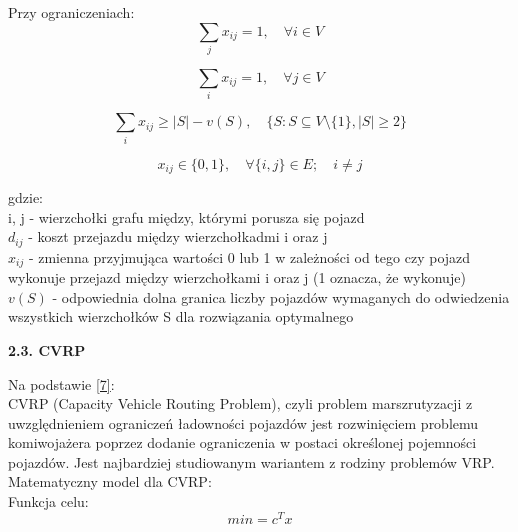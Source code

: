\documentclass[a4paper, twoside, 12pt, justified]{article}
\begin{document}
	Przy ograniczeniach:\\
	
	\begin{equation}
	{\sum\limits_{j} x_{ij} = 1, \quad \forall i \in V }
	\end{equation}
	
	\begin{equation}
	{\sum\limits_{i} x_{ij} = 1, \quad \forall j \in V }
	\end{equation}
	
	\begin{equation}
	{\sum\limits_{i} x_{ij} \geq |S| - v(S), \quad \{S : S \subseteq V \setminus\{1\}, |S| \geq 2  \} }
	\end{equation}
	
	\begin{equation}
	{x_{ij} \in \{0,1\}, \quad \forall\{i,j\} \in E ; \quad i \neq j }
	\end{equation}
	
	gdzie:\\
	i, j - wierzchołki grafu między, którymi porusza się pojazd\\
	$d_{ij}$ - koszt przejazdu między wierzchołkadmi i oraz j\\
	$x_{ij}$ - zmienna przyjmująca wartości 0 lub 1 w zależności od tego czy pojazd wykonuje przejazd między wierzchołkami i oraz j (1 oznacza, że wykonuje) \\
	$v(S)$ - odpowiednia dolna granica liczby pojazdów wymaganych do odwiedzenia wszystkich wierzchołków S dla rozwiązania optymalnego\\

	\begin{flushleft}
		\begin{large}
			\textbf{2.3. CVRP}
		\end{large}
	\end{flushleft}
	\vspace{5mm} %
	
	Na podstawie \hyperlink{cvrp-irnich}{[7]}:\\
	CVRP (Capacity Vehicle Routing Problem), czyli problem marszrutyzacji z uwzględnieniem ograniczeń ładowności pojazdów jest rozwinięciem problemu komiwojażera poprzez dodanie ograniczenia w postaci określonej pojemności pojazdów. Jest najbardziej studiowanym wariantem z rodziny problemów VRP. Matematyczny model dla CVRP:\\
	
	Funkcja celu:\\
	\begin{equation}
	{min= c^Tx}
	\end{equation}
	
\end{document}
